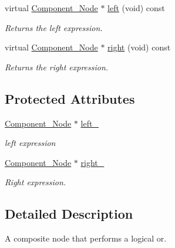 \begin{DoxyCompactItemize}
virtual \hyperlink{classMadara_1_1Expression__Tree_1_1Component__Node}{Component\_\-Node} $\ast$ \hyperlink{classMadara_1_1Expression__Tree_1_1Composite__Binary__Node_a6ca5cccbc46ccc6026c18f9665298380}{left} (void) const 
\begin{DoxyCompactList}\small\item\em Returns the left expression. \item\end{DoxyCompactList}\item 
virtual \hyperlink{classMadara_1_1Expression__Tree_1_1Component__Node}{Component\_\-Node} $\ast$ \hyperlink{classMadara_1_1Expression__Tree_1_1Composite__Unary__Node_ade55cde5707e0fa73ab1c019159b9aec}{right} (void) const 
\begin{DoxyCompactList}\small\item\em Returns the right expression. \item\end{DoxyCompactList}\end{DoxyCompactItemize}
\subsection*{Protected Attributes}
\begin{DoxyCompactItemize}
\item 
\hyperlink{classMadara_1_1Expression__Tree_1_1Component__Node}{Component\_\-Node} $\ast$ \hyperlink{classMadara_1_1Expression__Tree_1_1Composite__Binary__Node_acac60a70beb2484737e6e7161edb2d1b}{left\_\-}
\begin{DoxyCompactList}\small\item\em left expression \item\end{DoxyCompactList}\item 
\hyperlink{classMadara_1_1Expression__Tree_1_1Component__Node}{Component\_\-Node} $\ast$ \hyperlink{classMadara_1_1Expression__Tree_1_1Composite__Unary__Node_a077b7bd1b52df6f5c6adfde735556a68}{right\_\-}
\begin{DoxyCompactList}\small\item\em Right expression. \item\end{DoxyCompactList}\end{DoxyCompactItemize}


\subsection{Detailed Description}
A composite node that performs a logical or. 

